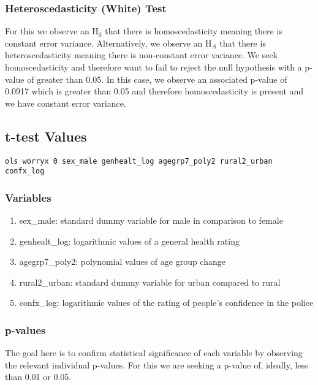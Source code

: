 \documentclass[11pt, english]{article}
\begin{document}
		\subsubsection{Heteroscedasticity (White) Test}

	For this we observe an H$_0$ that there is homoscedasticity meaning there is constant error variance. Alternatively, we observe an H$_A$ that there is heteroscedasticity meaning there is non-constant error variance. We seek homoscedasticity and therefore want to fail to reject the null hypothesis with a p-value of greater than 0.05. In this case, we observe an associated p-value of 0.0917 which is greater than 0.05 and therefore homoscedasticity is present and we have constant error variance.

	\newpage

	\subsection{t-test Values}

	\verb|ols worryx 0 sex_male genhealt_log agegrp7_poly2 rural2_urban confx_log|

		\subsubsection{Variables}

	\begin{enumerate}
	\setlength\itemsep{0cm}
		\item sex\_male: standard dummy variable for male in comparison to female
		\item genhealt\_log: logarithmic values of a general health rating
		\item agegrp7\_poly2: polynomial values of age group change
		\item rural2\_urban: standard dummy variable for urban compared to rural
		\item confx\_log: logarithmic values of the rating of people’s confidence in the police
	\end{enumerate}

		\subsubsection{p-values}

	The goal here is to confirm statistical significance of each variable by observing the relevant individual p-values. For this we are seeking a p-value of, ideally, less than 0.01 or 0.05.\\
\end{document}
